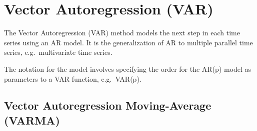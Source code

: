 \section{Vector Autoregression (VAR)}
\label{vector-autoregression-var}

The Vector Autoregression (VAR) method models the next step in each time
series using an AR model. It is the generalization of AR to multiple
parallel time series, e.g.~multivariate time series.

The notation for the model involves specifying the order for the AR(p)
model as parameters to a VAR function, e.g.~VAR(p).


\subsection{Vector Autoregression Moving-Average
(VARMA)}\label{vector-autoregression-moving-average-varma}

